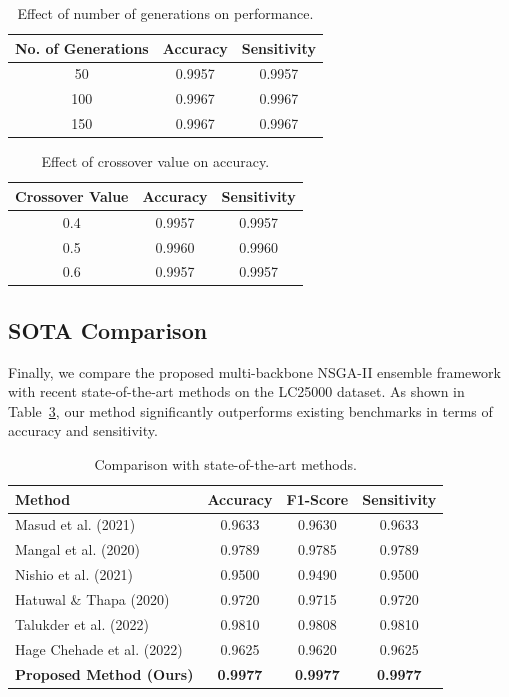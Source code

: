 \documentclass[11pt,a4paper]{article}
\begin{document}
\begin{table}[H]
\centering
\caption{Effect of number of generations on performance.}
\label{tab:generations-effect}
\begin{tabular}{|c|c|c|}
\hline
\textbf{No. of Generations} & \textbf{Accuracy} & \textbf{Sensitivity} \\
\hline
50 & 0.9957 & 0.9957 \\
100 & 0.9967 & 0.9967 \\
150 & 0.9967 & 0.9967 \\
\hline
\end{tabular}
\end{table}

\begin{table}[H]
\centering
\caption{Effect of crossover value on accuracy.}
\label{tab:crossover-effect}
\begin{tabular}{|c|c|c|}
\hline
\textbf{Crossover Value} & \textbf{Accuracy} & \textbf{Sensitivity} \\
\hline
0.4 & 0.9957 & 0.9957 \\
0.5 & 0.9960 & 0.9960 \\
0.6 & 0.9957 & 0.9957 \\
\hline
\end{tabular}
\end{table}

\subsection{SOTA Comparison}
Finally, we compare the proposed multi-backbone NSGA-II ensemble framework with recent state-of-the-art methods on the LC25000 dataset. As shown in Table~\ref{tab:sota-comparison}, our method significantly outperforms existing benchmarks in terms of accuracy and sensitivity.

\begin{table}[H]
\centering
\caption{Comparison with state-of-the-art methods.}
\label{tab:sota-comparison}
\begin{tabular}{|l|c|c|c|}
\hline
\textbf{Method} & \textbf{Accuracy} & \textbf{F1-Score} & \textbf{Sensitivity} \\
\hline
Masud et al. (2021) & 0.9633 & 0.9630 & 0.9633 \\
Mangal et al. (2020) & 0.9789 & 0.9785 & 0.9789 \\
Nishio et al. (2021) & 0.9500 & 0.9490 & 0.9500 \\
Hatuwal \& Thapa (2020) & 0.9720 & 0.9715 & 0.9720 \\
Talukder et al. (2022) & 0.9810 & 0.9808 & 0.9810 \\
Hage Chehade et al. (2022) & 0.9625 & 0.9620 & 0.9625 \\
\textbf{Proposed Method (Ours)} & \textbf{0.9977} & \textbf{0.9977} & \textbf{0.9977} \\
\hline
\end{tabular}
\end{table}
\end{document}
